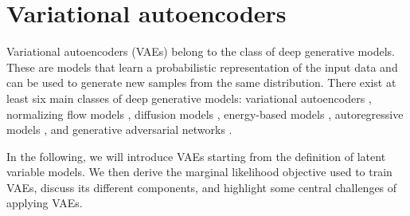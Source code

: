 \section{Variational autoencoders}
%
Variational autoencoders (VAEs) belong to the class of deep generative models. These are models that learn a probabilistic representation of the input data and can be used to generate new samples from the same distribution. 
There exist at least six main classes of deep generative models: variational autoencoders \parencite{kingma_autoencoding_2014,rezende_stochastic_2014,ranganath_hierarchical_2016,vahdat_nvae_2020,child_very_2021}, normalizing flow models \parencite{dinh_nice_2015,rezende_variational_2015,dinh_density_2017,kingma_glow_2018,grathwohl_ffjord_2018}, diffusion models \parencite{sohl-dickstein_deep_2015,song_generative_2019, ho_denoising_2020, vahdat_scorebased_2021}, energy-based models \parencite{lecun_tutorial_2006,hinton_fast_2006,salakhutdinov_efficient_2010,du_implicit_2019}, autoregressive models \parencite{oord_conditional_2016,oord_wavenet_2016,radford_improving_2018}, and generative adversarial networks \parencite{goodfellow_generative_2014,arjovsky_wasserstein_2017,brock_large_2019,karras_stylebased_2019}. 


In the following, we will introduce VAEs starting from the definition of latent variable models. We then derive the marginal likelihood objective used to train VAEs, discuss its different components, and highlight some central challenges of applying VAEs.



